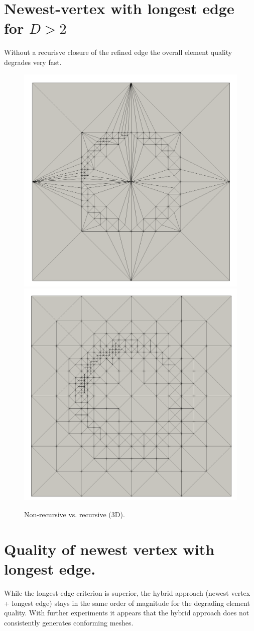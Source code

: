 \documentclass{article}
\begin{document}
\clearpage

\section{Newest-vertex with longest edge for $D>2$}

Without a recurisve closure of the refined edge the overall element quality degrades very fast.

\begin{figure}[htbp]
	\centering
	\includegraphics[width=0.48\linewidth]{figures/non-recursive} \hfill
	\includegraphics[width=0.48\linewidth]{figures/recursive}
	\caption{Non-recursive vs. recursive (3D).}
	\label{fig:metrics_r}
\end{figure}

\section{Quality of newest vertex with longest edge.}

While the longest-edge criterion is superior, the hybrid approach (newest vertex + longest edge) 
stays in the same order of magnitude for the degrading element quality. 
With further experiments it appears that the hybrid approach does not consistently generates conforming meshes.
\end{document}
